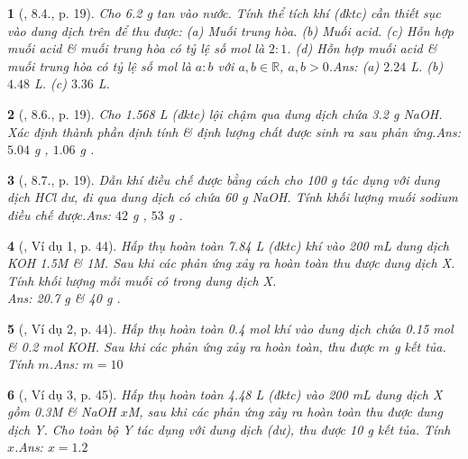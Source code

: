 \documentclass{article}
\newtheorem{baitoan}{}
\begin{document}
\begin{baitoan}[\cite{Truong_BTNC_Hoa_Hoc_9_2021}, 8.4., p. 19]
	Cho {\rm6.2 g } tan vào nước. Tính thể tích khí {\rm{}} (đktc) cần thiết sục vào dung dịch trên để thu được: (a) Muối trung hòa. (b) Muối acid. (c) Hỗn hợp muối acid \& muối trung hòa có tỷ lệ số mol là $2:1$. (d) Hỗn hợp muối acid \& muối trung hòa có tỷ lệ số mol là $a:b$ với $a,b\in\mathbb{R}$, $a,b > 0$.\hfill{\sf Ans: (a) $2.24$ L. (b) $4.48$ L. (c) $3.36$ L.}
\end{baitoan}

\begin{baitoan}[\cite{Truong_BTNC_Hoa_Hoc_9_2021}, 8.6., p. 19]
	Cho {\rm1.568 L } (đktc) lội chậm qua dung dịch chứa {\rm3.2 g NaOH}. Xác định thành phần định tính \& định lượng chất được sinh ra sau phản ứng.\hfill{\sf Ans: $5.04$ g , $1.06$ g .}
\end{baitoan}

\begin{baitoan}[\cite{Truong_BTNC_Hoa_Hoc_9_2021}, 8.7., p. 19]
	Dẫn khí {\rm{}} điều chế được bằng cách cho {\rm100 g } tác dụng với dung dịch {\rm HCl} dư, đi qua dung dịch có chứa {\rm60 g NaOH}. Tính khối lượng muối sodium điều chế được.\hfill{\sf Ans: $42$ g , $53$ g .}
\end{baitoan}

\begin{baitoan}[\cite{Truong_Long_Huong_bdhsg_Hoa_Hoc_9}, Ví dụ 1, p. 44]
	Hấp thụ hoàn toàn {\rm7.84 L} (đktc) khí {\rm{}} vào {\rm200 mL} dung dịch {\rm KOH 1.5M} \& {\rm{} 1M}. Sau khi các phản ứng xảy ra hoàn toàn thu được dung dịch X. Tính khối lượng mỗi muối có trong dung dịch X.\\\mbox{}\hfill{\sf Ans: 20.7 g  \& 40 g .}
\end{baitoan}

\begin{baitoan}[\cite{Truong_Long_Huong_bdhsg_Hoa_Hoc_9}, Ví dụ 2, p. 44]
	Hấp thụ hoàn toàn {\rm0.4 mol} khí {\rm{}} vào dung dịch chứa {\rm0.15 mol } \& {\rm0.2 mol KOH}. Sau khi các phản ứng xảy ra hoàn toàn, thu được $m$ {\rm g} kết tủa. Tính $m$.\hfill{\sf Ans: $m = 10$}
\end{baitoan}

\begin{baitoan}[\cite{Truong_Long_Huong_bdhsg_Hoa_Hoc_9}, Ví dụ 3, p. 45]
	Hấp thụ hoàn toàn {\rm4.48 L } (đktc) vào {\rm200 mL} dung dịch X gồm {\rm{} 0.3M \& NaOH $x$M}, sau khi các phản ứng xảy ra hoàn toàn thu được dung dịch Y. Cho toàn bộ Y tác dụng với dung dịch {\rm{}} (dư), thu được {\rm10 g} kết tủa. Tính $x$.\hfill{\sf Ans: $x = 1.2$}
\end{baitoan}
\end{document}
